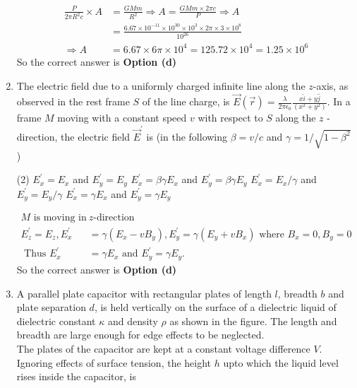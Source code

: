 \begin{enumerate}
\begin{answer}
\begin{align*}
	\frac{P}{2 \pi R^{2} c} \times A&=\frac{G M m}{R^{2}} \Rightarrow A=\frac{G M m \times 2 \pi c}{P} \Rightarrow A\\&=\frac{6.67 \times 10^{-11} \times 10^{30} \times 10^{3} \times 2 \pi \times 3 \times 10^{8}}{10^{26}} \\
	\Rightarrow A&=6.67 \times 6 \pi \times 10^{4}=125.72 \times 10^{4}=1.25 \times 10^{6}
	\end{align*}
		So the correct answer is \textbf{Option (d)}
\end{answer}
\item The electric field due to a uniformly charged infinite line along the $z$-axis, as observed in the rest frame $S$ of the line charge, is $\vec{E}(\vec{r})=\frac{\lambda}{2 \pi \epsilon_{0}} \frac{x \hat{i}+y \hat{j}}{\left(x^{2}+y^{2}\right)}$. In a frame $M$ moving with a constant speed $v$ with respect to $S$ along the $z$ - direction, the electric field $\vec{E}^{\prime}$ is (in the following $\beta=v / c$ and $\gamma=1 / \sqrt{1-\beta^{2}}$ )
 \begin{tasks}(2)
	\task[\textbf{a.}]$E_{x}^{\prime}=E_{x}$ and $E_{y}^{\prime}=E_{y}$
	\task[\textbf{b.}]$E_{x}^{\prime}=\beta \gamma E_{x}$ and $E_{y}^{\prime}=\beta \gamma E_{y}$
	\task[\textbf{c.}]$E_{x}^{\prime}=E_{x} / \gamma$ and $E_{y}^{\prime}=E_{y} / \gamma$
	\task[\textbf{d.}]  $E_{x}^{\prime}=\gamma E_{x}$ and $E_{y}^{\prime}=\gamma E_{y}$
\end{tasks}
\begin{answer}
	\begin{align*}
	M \text { is moving in }& z \text {-direction }\\
	E_{z}^{\prime}=E_{z}, E_{x}^{\prime}&=\gamma\left(E_{x}-v B_{y}\right), E_{y}^{\prime}=\gamma\left(E_{y}+v B_{x}\right)\text{ where }B_{x}=0, B_{y}=0\\
	\text{ Thus }E_{x}^{\prime}&=\gamma E_{x}\text{ and } E_{y}^{\prime}=\gamma E_{y}.
	\end{align*}
	So the correct answer is \textbf{Option (d)}
\end{answer}
\item A parallel plate capacitor with rectangular plates of length $l$, breadth $b$ and plate separation $d$, is held vertically on the surface of a dielectric liquid of dielectric constant $\kappa$ and density $\rho$ as shown in the figure. The length and breadth are large enough for edge effects to be neglected.\\
The plates of the capacitor are kept at a constant voltage difference $V$. Ignoring effects of surface tension, the height $h$ upto which the liquid level rises inside the capacitor, is

\end{enumerate}
